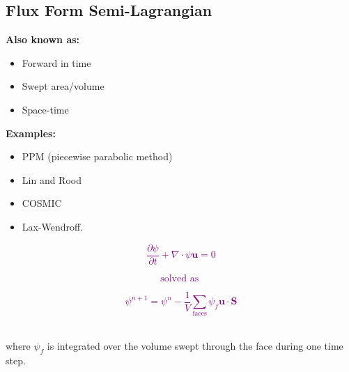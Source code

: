 \begin{minipage}[t]{0.6\columnwidth}%

\subsection{Flux Form Semi-Lagrangian}

\textbf{Also known as:}
\begin{itemize}
\item Forward in time
\item Swept area/volume
\item Space-time
\end{itemize}
\textbf{Examples: }
\begin{itemize}
\item PPM (piecewise parabolic method)
\item Lin and Rood
\item COSMIC
\item Lax-Wendroff. \nocite{LLM96,LLM95,CW84,LR96}
\end{itemize}
%
\end{minipage} %
\begin{minipage}[t]{0.38\columnwidth}%
\phantom{}\resizebox{1\textwidth}{!}{}
\begin{description}
\item [{\smiley{}}] 
\item [{\frownie{}}] 
\end{description}
%
\end{minipage}

\textcolor{purple}{}%
\begin{minipage}[t]{0.33\columnwidth}%
\begin{center}
\textcolor{purple}{
\[
\frac{\partial\psi}{\partial t}+\nabla\cdot\psi\mathbf{u}=0
\]
}
\par\end{center}%
\end{minipage}\textcolor{purple}{}%
\begin{minipage}[t]{0.2\columnwidth}%
\begin{center}
\textcolor{purple}{
\[
\text{solved as }
\]
}
\par\end{center}%
\end{minipage}\textcolor{purple}{}%
\begin{minipage}[t]{0.4\columnwidth}%
\begin{center}
\textcolor{purple}{
\[
\psi^{n+1}=\psi^{n}-\frac{1}{V}\sum_{\text{faces}}\psi_{f}\mathbf{u}\cdot\mathbf{S}
\]
}
\par\end{center}%
\end{minipage}\\
where $\psi_{f}$ is integrated over the volume swept through the
face during one time step. 

